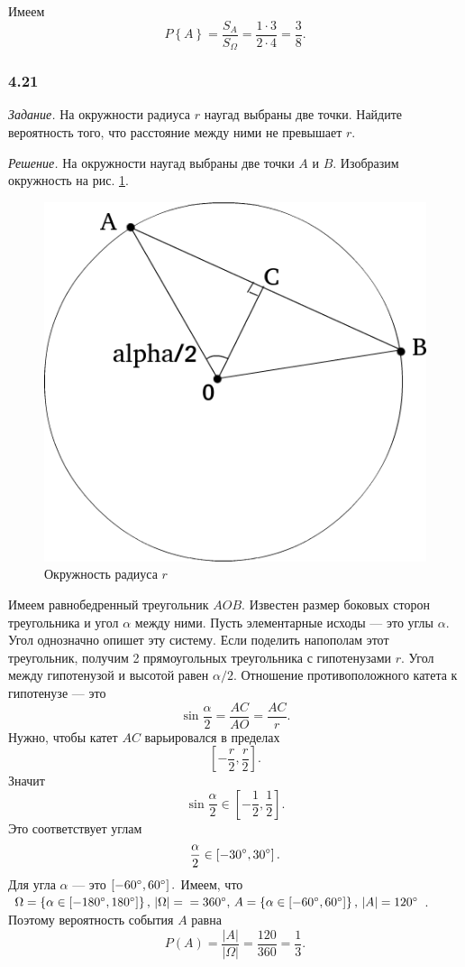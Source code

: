 Имеем
$$P \left\{ A \right\} =
\frac{S_A}{S_{ \Omega }} =
\frac{1 \cdot 3}{2 \cdot 4} =
\frac{3}{8}.$$

\subsubsection*{4.21}

\textit{Задание.} На окружности радиуса $r$ наугад выбраны две точки.
Найдите вероятность того, что расстояние между ними не превышает $r$.

\textit{Решение.} На окружности наугад выбраны две точки $A$ и $B$. Изобразим окружность на рис. \ref{fig:421}.

\begin{figure}[h!]
  \centering
  \includegraphics[width=.6\textwidth]{./pictures/4_21.png}
  \caption{Окружность радиуса $r$}
  \label{fig:421}
\end{figure}

Имеем равнобедренный треугольник $AOB$.
Известен размер боковых сторон треугольника и угол $ \alpha $ между ними.
Пусть элементарные исходы --- это углы $ \alpha $.
Угол однозначно опишет эту систему.
Если поделить напополам этот треугольник, получим 2 прямоугольных треугольника с гипотенузами $r$.
Угол между гипотенузой и высотой равен $ \alpha/2$.
Отношение противоположного катета к гипотенузе --- это
$$ \sin \frac{ \alpha }{2} =
\frac{AC}{AO} =
\frac{AC}{r}.$$
Нужно, чтобы катет $AC$ варьировался в пределах
$$ \left[ - \frac{r}{2}, \frac{r}{2} \right].$$
Значит
$$ \sin \frac{ \alpha }{2} \in \left[ - \frac{1}{2}, \frac{1}{2} \right].$$
Это соответствует углам
$$ \frac{ \alpha }{2} \in \left[ -30 \degree, 30 \degree \right].$$
Для угла $ \alpha $ --- это $ \left[ -60 \degree, 60 \degree \right].$
Имеем, что
$ \Omega =
\left\{ \alpha \in \left[ -180 \degree, 180 \degree \right] \right\}, \,
\left| \Omega \right| = \\
= 360 \degree, \,
A =
\left\{ \alpha \in \left[ -60 \degree, 60 \degree \right] \right\}, \,
\left| A \right| =
120 \degree $.
Поэтому вероятность события $A$ равна
$$P \left( A \right) =
\frac{ \left| A \right| }{ \left| \Omega \right| } =
\frac{120}{360} =
\frac{1}{3}.$$

